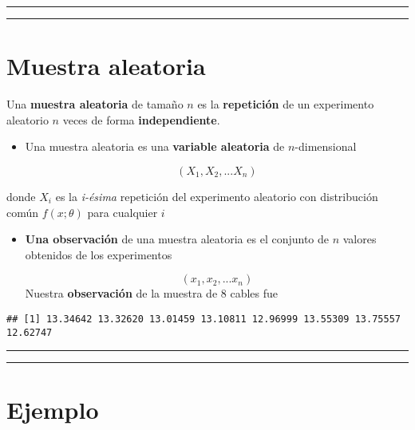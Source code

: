 \documentclass[
]{book}
\begin{document}
\begin{center}\rule{0.5\linewidth}{0.5pt}\end{center}

\begin{center}\rule{0.5\linewidth}{0.5pt}\end{center}

\hypertarget{muestra-aleatoria}{%
\section{Muestra aleatoria}\label{muestra-aleatoria}}

Una \textbf{muestra aleatoria} de tamaño \(n\) es la \textbf{repetición} de un experimento aleatorio \(n\) veces de forma \textbf{independiente}.

\begin{itemize}
\item
  Una muestra aleatoria es una \textbf{variable aleatoria} de \(n\)-dimensional

  \[(X_1, X_2, ... X_n)\]
\end{itemize}

donde \(X_i\) es la \emph{i-ésima} repetición del experimento aleatorio con distribución común \(f(x; \theta)\) para cualquier \(i\)

\begin{itemize}
\item
  \textbf{Una observación} de una muestra aleatoria es el conjunto de \(n\) valores obtenidos de los experimentos

  \[(x_1, x_2, ... x_n)\]
  Nuestra \textbf{observación} de la muestra de \(8\) cables fue
\end{itemize}

\begin{verbatim}
## [1] 13.34642 13.32620 13.01459 13.10811 12.96999 13.55309 13.75557 12.62747
\end{verbatim}

\begin{center}\rule{0.5\linewidth}{0.5pt}\end{center}

\begin{center}\rule{0.5\linewidth}{0.5pt}\end{center}

\hypertarget{ejemplo-13}{%
\section{Ejemplo}\label{ejemplo-13}}
\end{document}
